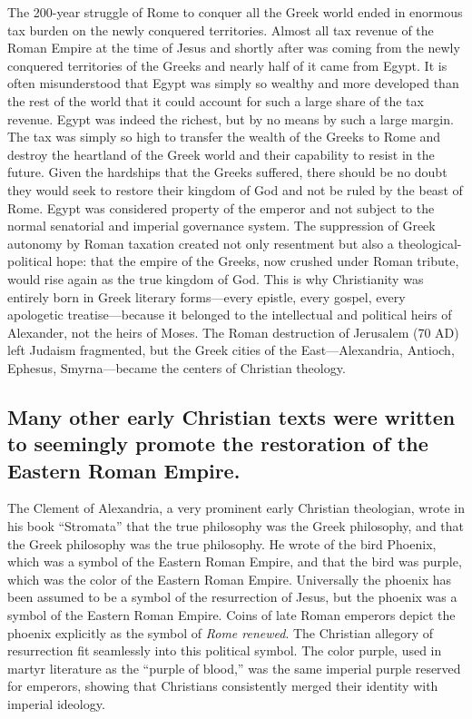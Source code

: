 The 200-year struggle of Rome to conquer all the Greek world ended in enormous tax burden on the newly conquered territories.
Almost all tax revenue of the Roman Empire at the time of Jesus and shortly after was coming from the newly conquered territories of the Greeks and nearly half of it came from Egypt.
It is often misunderstood that Egypt was simply so wealthy and more developed than the rest of the world that it could account for such a large share of the tax revenue.
Egypt was indeed the richest, but by no means by such a large margin.
The tax was simply so high to transfer the wealth of the Greeks to Rome and destroy the heartland of the Greek world and their capability to resist in the future.
Given the hardships that the Greeks suffered, there should be no doubt they would seek to restore their kingdom of God and not be ruled by the beast of Rome.
Egypt was considered property of the emperor and not subject to the normal senatorial and imperial governance system.
The suppression of Greek autonomy by Roman taxation created not only resentment but also a theological-political hope: that the empire of the Greeks, now crushed under Roman tribute, would rise again as the true kingdom of God.
This is why Christianity was entirely born in Greek literary forms---every epistle, every gospel, every apologetic treatise---because it belonged to the intellectual and political heirs of Alexander, not the heirs of Moses.
The Roman destruction of Jerusalem (70 AD) left Judaism fragmented, but the Greek cities of the East---Alexandria, Antioch, Ephesus, Smyrna---became the centers of Christian theology.

\subsection{Many other early Christian texts were written to seemingly promote the restoration of the Eastern Roman Empire.}\label{par:many-other-early-christian-texts-were-written-to-seemingly-promote-the-restoration-of-the-eastern-roman-empire.}

The Clement of Alexandria, a very prominent early Christian theologian, wrote in his book ``Stromata'' that the true philosophy was the Greek philosophy, and that the Greek philosophy was the true philosophy.
He wrote of the bird Phoenix, which was a symbol of the Eastern Roman Empire, and that the bird was purple, which was the color of the Eastern Roman Empire.
Universally the phoenix has been assumed to be a symbol of the resurrection of Jesus, but the phoenix was a symbol of the Eastern Roman Empire.
Coins of late Roman emperors depict the phoenix explicitly as the symbol of \emph{Rome renewed}.
The Christian allegory of resurrection fit seamlessly into this political symbol.
The color purple, used in martyr literature as the ``purple of blood,'' was the same imperial purple reserved for emperors, showing that Christians consistently merged their identity with imperial ideology.


